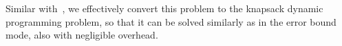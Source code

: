 Similar with~, we effectively convert this problem to the knapsack dynamic programming problem, so that it can be solved similarly as in the error bound mode, also with negligible overhead.

